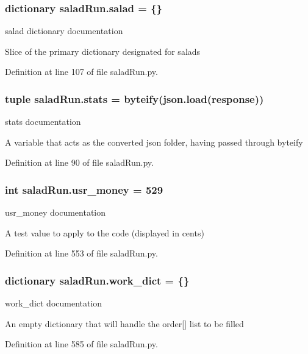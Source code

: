 \hypertarget{namespacesaladRun_a9f5cfdba188b5eb660da838ef21492fa}{
\subsubsection[{salad}]{\setlength{\rightskip}{0pt plus 5cm}dictionary salad\-Run.\-salad = \{\}}}\label{namespacesaladRun_a9f5cfdba188b5eb660da838ef21492fa}


salad dictionary documentation 

Slice of the primary dictionary designated for salads 

Definition at line 107 of file salad\-Run.\-py.

\hypertarget{namespacesaladRun_a691ebca0650ce8d0a1a703bf7ce0bdf3}{
\subsubsection[{stats}]{\setlength{\rightskip}{0pt plus 5cm}tuple salad\-Run.\-stats = {\bf byteify}(json.\-load({\bf response}))}}\label{namespacesaladRun_a691ebca0650ce8d0a1a703bf7ce0bdf3}


stats documentation 

A variable that acts as the converted json folder, having passed through byteify 

Definition at line 90 of file salad\-Run.\-py.

\hypertarget{namespacesaladRun_ae646741d59a2a7dfc02cae1124ab6310}{
\subsubsection[{usr\-\_\-money}]{\setlength{\rightskip}{0pt plus 5cm}int salad\-Run.\-usr\-\_\-money = 529}}\label{namespacesaladRun_ae646741d59a2a7dfc02cae1124ab6310}


usr\-\_\-money documentation 

A test value to apply to the code (displayed in cents) 

Definition at line 553 of file salad\-Run.\-py.

\hypertarget{namespacesaladRun_a518d1444a3279d13c3cde61259b42d7f}{
\subsubsection[{work\-\_\-dict}]{\setlength{\rightskip}{0pt plus 5cm}dictionary salad\-Run.\-work\-\_\-dict = \{\}}}\label{namespacesaladRun_a518d1444a3279d13c3cde61259b42d7f}


work\-\_\-dict documentation 

An empty dictionary that will handle the order\mbox{[}\mbox{]} list to be filled 

Definition at line 585 of file salad\-Run.\-py.

